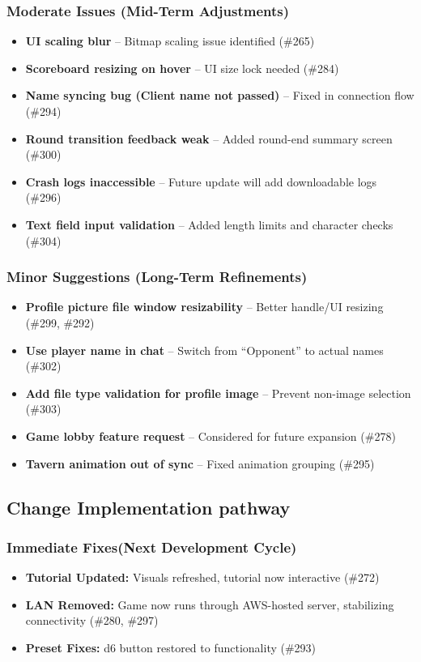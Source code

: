 \documentclass[12pt, titlepage]{article}
\begin{document}
\subsubsection{Moderate Issues (Mid-Term Adjustments)}
\begin{itemize}
    \item \textbf{UI scaling blur} – Bitmap scaling issue identified (\#265)
    \item \textbf{Scoreboard resizing on hover} – UI size lock needed (\#284)
    \item \textbf{Name syncing bug (Client name not passed)} – Fixed in connection flow (\#294)
    \item \textbf{Round transition feedback weak} – Added round-end summary screen (\#300)
    \item \textbf{Crash logs inaccessible} – Future update will add downloadable logs (\#296)
    \item \textbf{Text field input validation} – Added length limits and character checks (\#304)
\end{itemize}

\subsubsection{Minor Suggestions (Long-Term Refinements)}
\begin{itemize}
    \item \textbf{Profile picture file window resizability} – Better handle/UI resizing (\#299, \#292)
    \item \textbf{Use player name in chat} – Switch from “Opponent” to actual names (\#302)
    \item \textbf{Add file type validation for profile image} – Prevent non-image selection (\#303)
    \item \textbf{Game lobby feature request} – Considered for future expansion (\#278)
    \item \textbf{Tavern animation out of sync} – Fixed animation grouping (\#295)
\end{itemize}

\subsection{Change Implementation pathway}

\subsubsection{Immediate Fixes(Next Development Cycle)}
\begin{itemize}
    \item \textbf{Tutorial Updated:} Visuals refreshed, tutorial now interactive (\#272)
    \item \textbf{LAN Removed:} Game now runs through AWS-hosted server, stabilizing connectivity (\#280, \#297)
    \item \textbf{Preset Fixes:} d6 button restored to functionality (\#293)
\end{itemize}
\end{document}
